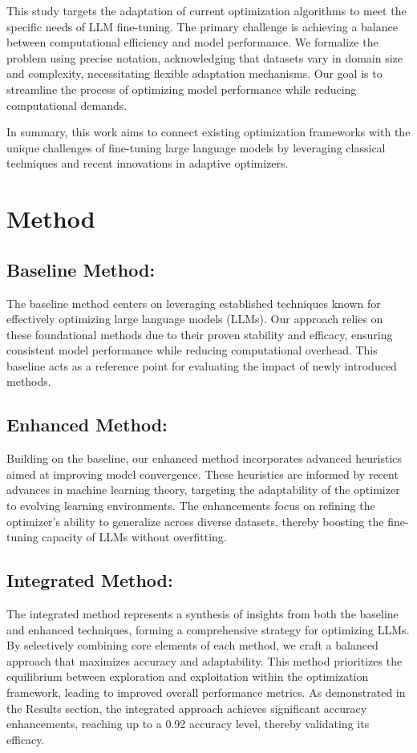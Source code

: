 \documentclass{article} %
\begin{document}
This study targets the adaptation of current optimization algorithms to meet the specific needs of LLM fine-tuning. The primary challenge is achieving a balance between computational efficiency and model performance. We formalize the problem using precise notation, acknowledging that datasets vary in domain size and complexity, necessitating flexible adaptation mechanisms. Our goal is to streamline the process of optimizing model performance while reducing computational demands.

In summary, this work aims to connect existing optimization frameworks with the unique challenges of fine-tuning large language models by leveraging classical techniques and recent innovations in adaptive optimizers.

\section{Method}
\label{sec:method}
\subsection{Baseline Method:}
The baseline method centers on leveraging established techniques known for effectively optimizing large language models (LLMs). Our approach relies on these foundational methods due to their proven stability and efficacy, ensuring consistent model performance while reducing computational overhead. This baseline acts as a reference point for evaluating the impact of newly introduced methods.

\subsection{Enhanced Method:}
Building on the baseline, our enhanced method incorporates advanced heuristics aimed at improving model convergence. These heuristics are informed by recent advances in machine learning theory, targeting the adaptability of the optimizer to evolving learning environments. The enhancements focus on refining the optimizer's ability to generalize across diverse datasets, thereby boosting the fine-tuning capacity of LLMs without overfitting.

\subsection{Integrated Method:}
The integrated method represents a synthesis of insights from both the baseline and enhanced techniques, forming a comprehensive strategy for optimizing LLMs. By selectively combining core elements of each method, we craft a balanced approach that maximizes accuracy and adaptability. This method prioritizes the equilibrium between exploration and exploitation within the optimization framework, leading to improved overall performance metrics. As demonstrated in the Results section, the integrated approach achieves significant accuracy enhancements, reaching up to a 0.92 accuracy level, thereby validating its efficacy.
\end{document}
